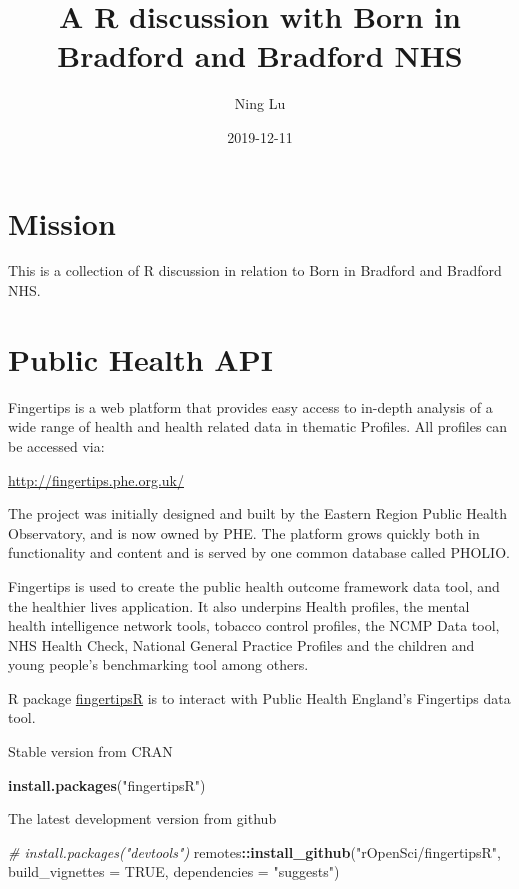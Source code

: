 \documentclass[]{book}
\title{A R discussion with Born in Bradford and Bradford NHS}
\author{Ning Lu}
\date{2019-12-11}
\newenvironment{Shaded}{\begin{snugshade}}{\end{snugshade}}
\newcommand{\CommentTok}[1]{\textcolor[rgb]{0.56,0.35,0.01}{\textit{#1}}}
\newcommand{\DataTypeTok}[1]{\textcolor[rgb]{0.13,0.29,0.53}{#1}}
\newcommand{\KeywordTok}[1]{\textcolor[rgb]{0.13,0.29,0.53}{\textbf{#1}}}
\newcommand{\NormalTok}[1]{#1}
\newcommand{\OperatorTok}[1]{\textcolor[rgb]{0.81,0.36,0.00}{\textbf{#1}}}
\newcommand{\OtherTok}[1]{\textcolor[rgb]{0.56,0.35,0.01}{#1}}
\newcommand{\StringTok}[1]{\textcolor[rgb]{0.31,0.60,0.02}{#1}}
\begin{document}
\maketitle

{
\setcounter{tocdepth}{1}
\tableofcontents
}
\hypertarget{mission}{%
\chapter{Mission}\label{mission}}

This is a collection of R discussion in relation to Born in Bradford and Bradford NHS.

\hypertarget{public-health-api}{%
\chapter{Public Health API}\label{public-health-api}}

Fingertips is a web platform that provides easy access to in-depth analysis of a wide range of health and health related data in thematic Profiles. All profiles can be accessed via:

\url{http://fingertips.phe.org.uk/}

The project was initially designed and built by the Eastern Region Public Health Observatory, and is now owned by PHE. The platform grows quickly both in functionality and content and is served by one common database called PHOLIO.

Fingertips is used to create the public health outcome framework data tool, and the healthier lives application. It also underpins Health profiles, the mental health intelligence network tools, tobacco control profiles, the NCMP Data tool, NHS Health Check, National General Practice Profiles and the children and young people's benchmarking tool among others.

R package \href{https://github.com/ropensci/fingertipsR}{fingertipsR} is to interact with Public Health England's Fingertips data tool.

Stable version from CRAN

\begin{Shaded}
\begin{Highlighting}[]
\KeywordTok{install.packages}\NormalTok{(}\StringTok{"fingertipsR"}\NormalTok{)}
\end{Highlighting}
\end{Shaded}

The latest development version from github

\begin{Shaded}
\begin{Highlighting}[]
\CommentTok{# install.packages("devtools")}
\NormalTok{remotes}\OperatorTok{::}\KeywordTok{install_github}\NormalTok{(}\StringTok{"rOpenSci/fingertipsR"}\NormalTok{,}
                        \DataTypeTok{build_vignettes =} \OtherTok{TRUE}\NormalTok{,}
                        \DataTypeTok{dependencies =} \StringTok{"suggests"}\NormalTok{)}
\end{Highlighting}
\end{Shaded}
\end{document}
